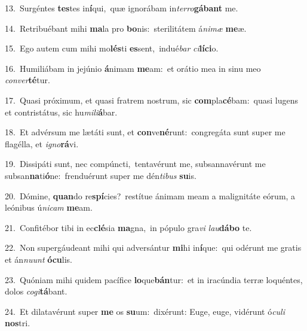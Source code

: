 {\numbfont\textcolor{\numbcolor}{13.}}~Surgéntes \textbf{tes}\-tes in\-\textbf{í}\-qui,~\star quæ ignorábam in\-\textit{ter}\-\textit{ro}\textbf{gá}\textbf{bant} me.\par
{\numbfont\textcolor{\numbcolor}{14.}}~Retribuébant mihi \textbf{ma}\-la pro \textbf{bo}\-nis:~\star sterilitátem á\-\textit{ni}\-\textit{mæ} \textbf{me}\-æ.\par
{\numbfont\textcolor{\numbcolor}{15.}}~Ego autem cum mihi mo\-\textbf{lés}\-ti \textbf{es}\-sent,~\star indué\textit{bar} \textit{ci}\-\textbf{lí}\textbf{ci}o.\par
{\numbfont\textcolor{\numbcolor}{16.}}~Humiliábam in jejúnio \textbf{á}\-nimam \textbf{me}\-am:~\star et orátio mea in sinu meo \textit{con}\-\textit{ver}\textbf{té}tur.\par
{\numbfont\textcolor{\numbcolor}{17.}}~Quasi próximum, et quasi fratrem nostrum, sic \textbf{com}\-pla\-\textbf{cé}\-bam:~\star quasi lugens et contristátus, sic hu\-\textit{mi}\-\textit{li}\textbf{á}bar.\par
{\numbfont\textcolor{\numbcolor}{18.}}~Et advérsum me lætáti sunt, et \textbf{con}\-ve\-\textbf{né}\-runt:~\star congregáta sunt super me flagélla, et \textit{i}\-\textit{gno}\textbf{rá}vi.\par
{\numbfont\textcolor{\numbcolor}{19.}}~Dissipáti sunt, nec compúncti,~\dagger tentavérunt me, subsannavérunt me subsan\-\textbf{na}\-ti\-\textbf{ó}\-ne:~\star frenduérunt super me dén\-\textit{ti}\-\textit{bus} \textbf{su}\-is.\par
{\numbfont\textcolor{\numbcolor}{20.}}~Dómine, \textbf{quan}\-do re\-\textbf{spí}\-cies?~\star restítue ánimam meam a malignitáte eórum, a leónibus ú\-\textit{ni}\-\textit{cam} \textbf{me}\-am.\par
{\numbfont\textcolor{\numbcolor}{21.}}~Confitébor tibi in ec\-\textbf{clé}\-sia \textbf{ma}\-gna,~\star in pópulo gra\textit{vi} \textit{lau}\-\textbf{dá}\textbf{bo} te.\par
{\numbfont\textcolor{\numbcolor}{22.}}~Non supergáudeant mihi qui adversántur \textbf{mi}\-hi in\-\textbf{í}\-que:~\star qui odérunt me gratis et án\-\textit{nu}\-\textit{unt} \textbf{ó}\-\textbf{cu}lis.\par
{\numbfont\textcolor{\numbcolor}{23.}}~Quóniam mihi quidem pacífice \textbf{lo}\-que\-\textbf{bán}\-tur:~\star et in iracúndia terræ loquéntes, dolos \textit{co}\-\textit{gi}\textbf{tá}bant.\par
{\numbfont\textcolor{\numbcolor}{24.}}~Et dilatavérunt super \textbf{me} os \textbf{su}\-um:~\star dixérunt: Euge, euge, vidérunt ó\-\textit{cu}\-\textit{li} \textbf{nos}\-tri.\par
